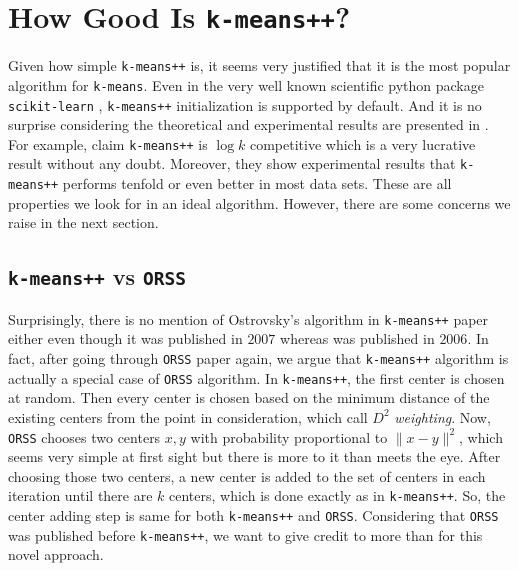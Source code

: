 \documentclass[twoside, 11pt]{article}
\begin{document}
	\section{How Good Is \texttt{k-means++}?}\label{sec:kmeans++vsorss}
	Given how simple \texttt{k-means++} is, it seems very justified that it is the most popular algorithm for \texttt{k-means}. Even in the very well known scientific python package \texttt{scikit-learn} \citep{sklearn}, \texttt{k-means++} initialization is supported by default. And it is no surprise considering the theoretical and experimental results are presented in \citep{kmeans++}. For example, \cite{kmeans++} claim \texttt{k-means++} is $\log{k}$ competitive which is a very lucrative result without any doubt. Moreover, they show experimental results that \texttt{k-means++} performs tenfold or even better in most data sets. These are all properties we look for in an ideal algorithm. However, there are some concerns we raise in the next section.
	\subsection{\texttt{k-means++} vs \texttt{ORSS}}
	Surprisingly, there is no mention of Ostrovsky's algorithm in \texttt{k-means++} paper either even though it was published in $2007$ whereas \cite{ostrovsky} was published in $2006$. In fact, after going through \texttt{ORSS} paper again, we argue that \texttt{k-means++} algorithm is actually a special case of \texttt{ORSS} algorithm. In \texttt{k-means++}, the first center is chosen at random. Then every center is chosen based on the minimum distance of the existing centers from the point in consideration, which \cite{kmeans++} call $D^2$ \textit{weighting}. Now, \texttt{ORSS} chooses two centers $x,y$ with probability proportional to $\|x-y\|^2$, which seems very simple at first sight but there is more to it than meets the eye. After choosing those two centers, a new center is added to the set of centers in each iteration until there are $k$ centers, which is done exactly as in \texttt{k-means++}. So, the center adding step is same for both \texttt{k-means++} and \texttt{ORSS}. Considering that \texttt{ORSS} was published before \texttt{k-means++}, we want to give credit to \cite{ostrovsky} more than \cite{kmeans++} for this novel approach.
	
\end{document}
